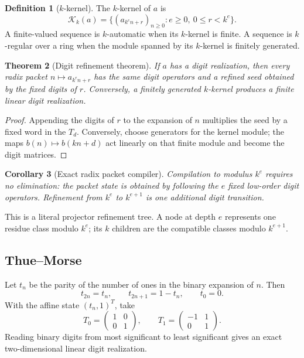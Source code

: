 \documentclass[11pt]{article}
\newtheorem{theorem}{Theorem}[section]\newtheorem{proposition}[theorem]{Proposition}\newtheorem{lemma}[theorem]{Lemma}\newtheorem{corollary}[theorem]{Corollary}
\theoremstyle{definition}\newtheorem{definition}[theorem]{Definition}\newtheorem{example}[theorem]{Example}\newtheorem{construction}[theorem]{Construction}\newtheorem{algorithm}[theorem]{Algorithm}\newtheorem{conjecture}[theorem]{Conjecture}\newtheorem{problem}[theorem]{Problem}
\theoremstyle{remark}\newtheorem{remark}[theorem]{Remark}\newtheorem{boundary}[theorem]{Boundary}\newtheorem{certificate}[theorem]{Computational Certificate}\newtheorem{classical}[theorem]{Classical Input}\newtheorem{principle}[theorem]{Structural Principle}
\begin{document}
\begin{definition}[$k$-kernel]
The $k$-kernel of $a$ is
\[
 \mathcal K_k(a)=\{(a_{k^en+r})_{n\geq0}:e\geq0,\ 0\leq r<k^e\}.
\]
A finite-valued sequence is $k$-automatic when its $k$-kernel is finite.  A sequence is $k$-regular over a ring when the module spanned by its $k$-kernel is finitely generated.
\end{definition}

\begin{theorem}[Digit refinement theorem]
If $a$ has a digit realization, then every radix packet $n\mapsto a_{k^en+r}$ has the same digit operators and a refined seed obtained by the fixed digits of $r$.  Conversely, a finitely generated $k$-kernel produces a finite linear digit realization.
\end{theorem}
\begin{proof}
Appending the digits of $r$ to the expansion of $n$ multiplies the seed by a fixed word in the $T_d$.  Conversely, choose generators for the kernel module; the maps $b(n)\mapsto b(kn+d)$ act linearly on that finite module and become the digit matrices.
\end{proof}

\begin{corollary}[Exact radix packet compiler]
Compilation to modulus $k^e$ requires no elimination: the packet state is obtained by following the $e$ fixed low-order digit operators.  Refinement from $k^e$ to $k^{e+1}$ is one additional digit transition.
\end{corollary}

This is a literal projector refinement tree.  A node at depth $e$ represents one residue class modulo $k^e$; its $k$ children are the compatible classes modulo $k^{e+1}$.

\subsection{Thue--Morse}
Let $t_n$ be the parity of the number of ones in the binary expansion of $n$.  Then
\[
 \boxed{t_{2n}=t_n,\qquad t_{2n+1}=1-t_n,\qquad t_0=0.}
\]
With the affine state $(t_n,1)^T$, take
\[
 T_0=\begin{pmatrix}1&0\\0&1\end{pmatrix},\qquad
 T_1=\begin{pmatrix}-1&1\\0&1\end{pmatrix}.
\]
Reading binary digits from most significant to least significant gives an exact two-dimensional linear digit realization.
\end{document}
